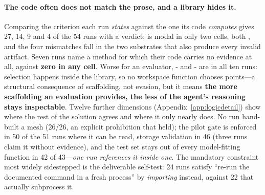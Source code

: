 \paragraph{The code often does not match the prose, and a library hides it.}
Comparing the criterion each run \emph{states} against the one its code
\emph{computes} gives  27,  14,
 9 and  4 of the 54 runs with a verdict; 
is modal in only two cells, both \Lthree{}, and the four mismatches fall in the
two substrates that also produce every invalid artifact. Seven \Ltwo{} runs name
a method for which their code carries no evidence at all, against \textbf{zero
in any \Lthree{} cell}. Worse for an evaluator, \Ltwo{}- and
\Ltwo{}- are  in all ten runs: selection
happens inside the library, so no workspace function chooses points---a
structural consequence of scaffolding, not evasion, but it means \textbf{the
more scaffolding an evaluation provides, the less of the agent's reasoning stays
inspectable}. Twelve further dimensions
(Appendix~\ref{app:logicdetail}) show where the rest of the solution agrees and
where it only nearly does. No \Lthree{} run hand-built a mesh (26/26, an
explicit prohibition that held); the pilot gate is enforced in 50 of the 51 runs
where it can be read, storage validation in 46 (three runs claim it without
evidence), and the test set stays out of every model-fitting function in 42 of
43---\emph{one run references it inside one}. The mandatory constraint most
widely sidestepped is the deliverable self-test: 24 runs satisfy ``re-run the
documented command in a fresh process'' by \emph{importing} 
instead, against 22 that actually subprocess it.
